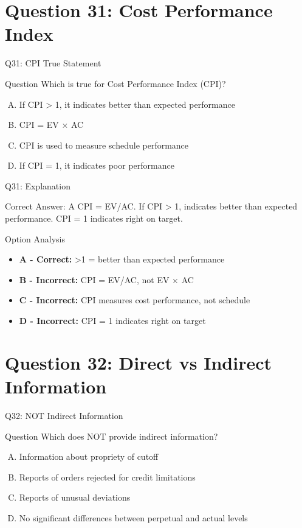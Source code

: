 \documentclass{beamer}
\begin{document}
	\section{Question 31: Cost Performance Index}
	
	\begin{frame}{Q31: CPI True Statement}
		\begin{block}{Question}
			Which is true for Cost Performance Index (CPI)?
		\end{block}
		\begin{enumerate}[(A)]
			\item If CPI > 1, it indicates better than expected performance
			\item CPI = EV × AC
			\item CPI is used to measure schedule performance
			\item If CPI = 1, it indicates poor performance
		\end{enumerate}
	\end{frame}
	
	\begin{frame}{Q31: Explanation}
		\begin{block}{Correct Answer: A}
			CPI = EV/AC. If CPI > 1, indicates better than expected performance. CPI = 1 indicates right on target.
		\end{block}
		\begin{block}{Option Analysis}
			\begin{itemize}
				\item \textbf{A - Correct:} >1 = better than expected performance
				\item \textbf{B - Incorrect:} CPI = EV/AC, not EV × AC
				\item \textbf{C - Incorrect:} CPI measures cost performance, not schedule
				\item \textbf{D - Incorrect:} CPI = 1 indicates right on target
			\end{itemize}
		\end{block}
	\end{frame}
	
	\section{Question 32: Direct vs Indirect Information}
	
	\begin{frame}{Q32: NOT Indirect Information}
		\begin{block}{Question}
			Which does NOT provide indirect information?
		\end{block}
		\begin{enumerate}[(A)]
			\item Information about propriety of cutoff
			\item Reports of orders rejected for credit limitations
			\item Reports of unusual deviations
			\item No significant differences between perpetual and actual levels
		\end{enumerate}
	\end{frame}
	
\end{document}
